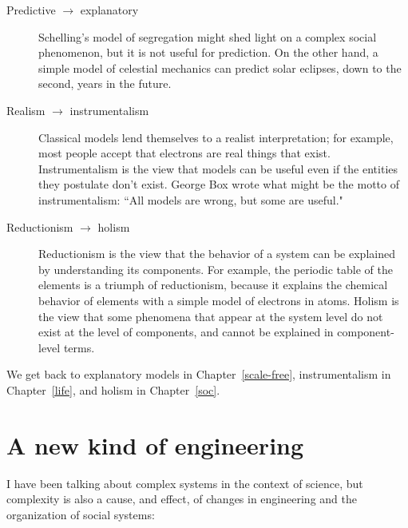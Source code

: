 \documentclass[12pt]{book}
\theoremstyle{exercise}
\begin{document}
\begin{description}

\item[Predictive $\rightarrow$ explanatory] Schelling's model
of segregation might shed light on a complex social phenomenon, but
it is not useful for prediction.  On the other hand, a simple model
of celestial mechanics can predict solar eclipses, down to the second,
years in the future.


\item[Realism $\rightarrow$ instrumentalism] Classical models lend
  themselves to a realist interpretation; for example, most people
  accept that electrons are real things that exist.  Instrumentalism
  is the view that models can be useful even if the entities they
  postulate don't exist.  George Box wrote what might be the motto of
  instrumentalism: ``All models are wrong, but some are useful."


\item[Reductionism $\rightarrow$ holism] Reductionism is the view that
  the behavior of a system can be explained by understanding its
  components.  For example, the periodic table of the elements is a
  triumph of reductionism, because it explains the chemical behavior
  of elements with a simple model of electrons in atoms.  Holism
  is the view that some phenomena that appear at the system level do
  not exist at the level of components, and cannot be explained in
  component-level terms.


\end{description}

We get back to explanatory models in Chapter~\ref{scale-free},
instrumentalism in Chapter~\ref{life}, and holism in Chapter~\ref{soc}.


\section{A new kind of engineering}

I have been talking about complex systems in the context of science,
but complexity is also a cause, and effect, of
changes in engineering and the organization of social
systems:

\end{document}

